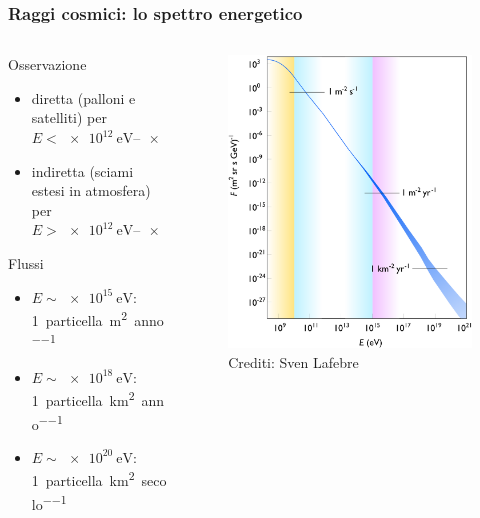\documentclass[10pt]{beamer}
\begin{document}
\begin{frame}
  \frametitle{Raggi cosmici: lo spettro energetico}
  \begin{columns}
    \begin{column}{0.55\columnwidth}
      Osservazione
      \begin{itemize}
      \item diretta (palloni e satelliti) per
        $E < \SIrange[range-phrase=-]{e12}{e14}{\electronvolt}$
      \item indiretta (sciami estesi in atmosfera) per
        $E > \SIrange[range-phrase=-]{e12}{e14}{\electronvolt}$
      \end{itemize}
      Flussi
      \begin{itemize}
      \item $E \sim \SI{e15}{\electronvolt}$:
        \SI{1}{particella\per\metre\squared\per anno}
      \item $E \sim \SI{e18}{\electronvolt}$:
        \SI{1}{particella\per\kilo\metre\squared\per anno}
      \item $E \sim \SI{e20}{\electronvolt}$:
        \SI{1}{particella\per\kilo\metre\squared\per secolo}
      \end{itemize}
    \end{column}
    \begin{column}{0.45\columnwidth}
      \begin{figure}
        \centering
        \includegraphics[width=\columnwidth]{cr-spectrum}
        \caption{Crediti: Sven Lafebre}
      \end{figure}
    \end{column}
  \end{columns}
\end{frame}
\end{document}
